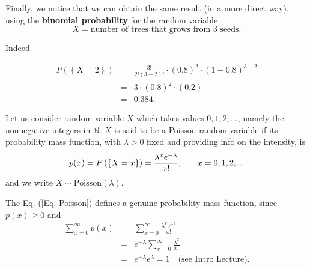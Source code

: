 \documentclass[smaller, handout]{beamer}\usepackage[]{graphicx}\usepackage[]{color}
\renewcommand{\Pr}{P}
\newcommand{\bea}{\begin{eqnarray}}
\newcommand{\eea}{\end{eqnarray}}
\newcommand{\nn}{\nonumber}
\begin{document}
\begin{frame}{\secname}%


\begin{example}
Finally, we notice that we can obtain the same result (in a more direct way), using the \textbf{binomial probability} for the random variable
$$X= \text{number of trees that grows
from 3 seeds}.$$

Indeed

\begin{eqnarray*}
\Pr (\left\{ X=2\right\})  &=&\frac{3!}{2!\left( 3-2\right) !}\cdot \left(
0.8\right) ^{2} \cdot \left( 1-0.8\right) ^{3-2} \\
&=&3 \cdot \left( 0.8\right) ^{2} \cdot \left( 0.2\right)  \\
&=&0.384.
\end{eqnarray*}
\end{example}

\end{frame}%


\begin{frame}{\secname}%


\begin{definition}
Let us consider random variable $X$ which takes values $0,1,2,...$, namely the nonnegative integers in $\mathbb{N}$. $X$ is said to be a Poisson random variable if its probability mass function, with $\lambda >0$ fixed and providing info on the intensity, is
\begin{equation}
p(x)=\Pr \left( \{ X = x \}\right) =\frac{\lambda ^{x}e^{-\lambda }}{x!}\text{,\qquad }%
x=0,1,2,... \label{Eq. Poisson}
\end{equation}
and we write $X\sim \text{Poisson}(\lambda)$.
\end{definition}
\vspace{0.2cm}
The Eq. (\ref{Eq. Poisson}) defines a genuine probability mass function, since $p(x) \geq 0$ and
\bea
\sum_{x=0}^{\infty} p(x) &=& \sum_{x=0}^{\infty}  \frac{\lambda ^{x}e^{-\lambda }}{x!}  \nn \\
& = & e^{-\lambda } \sum_{x=0}^{\infty}   \frac{\lambda ^{x}}{x!} \nn \\
& = & e^{-\lambda } e^{\lambda } = 1 \nn \quad \text{(see Intro Lecture).}
\eea
\end{frame}%
\end{document}
